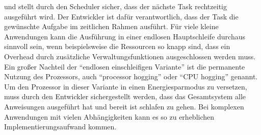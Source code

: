 und stellt durch den Scheduler sicher, dass der näch\-ste Task rechtzeitig ausgeführt wird. Der Entwickler ist dafür verantwortlich, dass der Task die ge\-wün\-schte Aufgabe im zeitlichen Rahmen ausführt. 
Für viele kleine Anwendungen kann die Ausführung in einer endlosen Hauptschleife durchaus sinnvoll sein, wenn beispielsweise die Ressourcen so knapp sind, dass ein Overhead durch zusätzliche Verwaltungsfunktionen ausgeschlossen werden muss. Ein großer Nachteil der "`endlosen einschleifigen Variante"' ist die permanente Nutzung des Prozessors, auch "`processor hogging"' oder "`CPU hogging"' genannt. Um den Prozessor in dieser Variante in einen Energiesparmodus zu versetzen, muss durch den Entwickler sichergestellt werden, dass das Gesamtsystem alle Anweisungen ausgeführt hat und bereit ist schlafen zu gehen. Bei komplexen Anwendungen mit vielen Ab\-häng\-ig\-kei\-ten kann es so zu erheblichen Implementierungsaufwand kommen.
